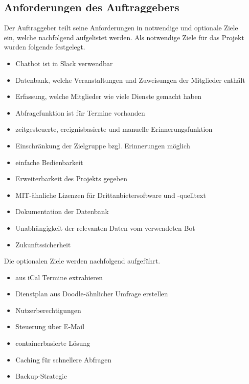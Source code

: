 \subsection{Anforderungen des Auftraggebers}
Der Auftraggeber teilt seine Anforderungen in notwendige und optionale Ziele ein, welche nachfolgend aufgelistet werden. Als notwendige Ziele für das Projekt wurden folgende festgelegt.

\begin{itemize}
	\item Chatbot ist in Slack verwendbar
	\item Datenbank, welche Veranstaltungen und Zuweisungen der Mitglieder enthält
	\item Erfassung, welche Mitglieder wie viele Dienste gemacht haben
	\item Abfragefunktion ist für Termine vorhanden
	\item zeitgesteuerte, ereignisbasierte und manuelle Erinnerungsfunktion
	\item Einschränkung der Zielgruppe bzgl. Erinnerungen möglich
	\item einfache Bedienbarkeit
	\item Erweiterbarkeit des Projekts gegeben
	\item MIT-ähnliche Lizenzen für Drittanbietersoftware und -quelltext
	\item Dokumentation der Datenbank
	\item Unabhängigkeit der relevanten Daten vom verwendeten Bot
	\item Zukunftssicherheit
\end{itemize}


Die optionalen Ziele werden nachfolgend aufgeführt.
\begin{itemize}
	\item aus iCal Termine extrahieren
	\item Dienstplan aus Doodle-ähnlicher Umfrage erstellen
	\item Nutzerberechtigungen
	\item Steuerung über E-Mail
	\item containerbasierte Lösung
	\item Caching für schnellere Abfragen
	\item Backup-Strategie
\end{itemize}


